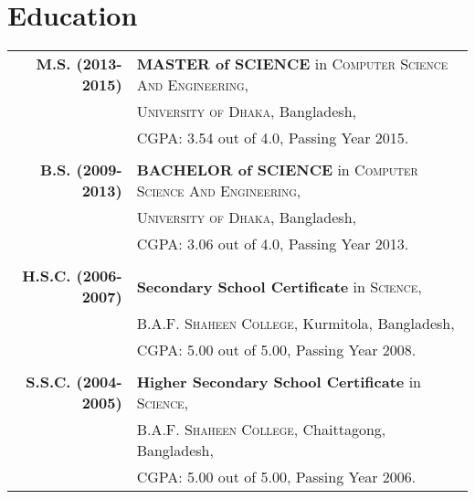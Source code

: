 \documentclass[a4paper,10pt]{article}
\newcommand{\du}{University of Dhaka}
\newcommand{\shaheen}{B.A.F. Shaheen College}
\newcommand{\bd}{Bangladesh}
\newcommand{\subcse}{Computer Science And Engineering}
\begin{document}
\section*{Education}
\begin{tabular}{r|l}
\\
\textbf{M.S. (2013-2015)}		&\textbf{MASTER of SCIENCE} in \textsc{\subcse},\\
							&\textsc{\du}, \bd,\\
							&CGPA: 3.54 out of 4.0, Passing Year 2015.\\\\
							
\textbf{B.S. (2009-2013)}		&\textbf{BACHELOR of SCIENCE} in \textsc{\subcse}, \\
							&\textsc{\du}, \bd,\\
							&CGPA: 3.06 out of 4.0, Passing Year 2013.\\\\

\textbf{H.S.C. (2006-2007)}		&\textbf{Secondary School Certificate} in \textsc{Science}, \\
							&\textsc{\shaheen}, Kurmitola, \bd,\\
							&CGPA: 5.00 out of 5.00, Passing Year 2008.\\\\
							
\textbf{S.S.C. (2004-2005)}		&\textbf{Higher Secondary School Certificate} in \textsc{Science}, \\
							&\textsc{\shaheen}, Chaittagong, \bd,\\
							&CGPA: 5.00 out of 5.00, Passing Year 2006.\\

\end{tabular}
\end{document}
